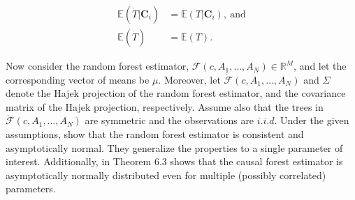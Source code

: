 \documentclass[12pt]{article}
\newtheorem{lemma}{Lemma}[section]
\begin{document}
\begin{align}
    \mathbb{E}(\dot{T}|\mathbf{C}_i) &= \mathbb{E}(T|\mathbf{C}_i), \ \text{and} \\
    \mathbb{E}(\dot{T}) &= \mathbb{E}(T).\nonumber
\end{align}


Now consider the random forest estimator, $\mathcal{F}(c, A_1, \dots, A_N) \in \mathbb{R}^M$, and let the corresponding vector of means be $\mu$. Moreover, let $\dot{\mathcal{F}}(c, A_1, \dots, A_N)$ and $\Sigma$ denote the Hajek projection of the random forest estimator, and the covariance matrix of the Hajek projection, respectively. Assume also that the trees in $\dot{\mathcal{F}}(c, A_1, \dots, A_N)$ are symmetric and the observations are $i.i.d$. 
Under the given assumptions,
\cite{wager2018estimation} show that the random forest estimator is consistent and asymptotically normal. They generalize the properties to a single parameter of interest. Additionally, \cite{nareklishvili2022adaptive} in Theorem 6.3 shows that the causal forest estimator is asymptotically normally distributed even for multiple (possibly correlated) parameters. 





\end{document}
